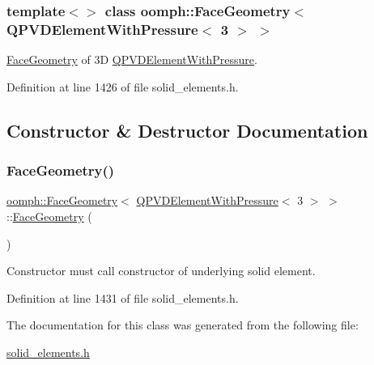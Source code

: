 \subsubsection*{template$<$$>$\newline
class oomph\+::\+Face\+Geometry$<$ Q\+P\+V\+D\+Element\+With\+Pressure$<$ 3 $>$ $>$}

\hyperlink{classoomph_1_1FaceGeometry}{Face\+Geometry} of 3D \hyperlink{classoomph_1_1QPVDElementWithPressure}{Q\+P\+V\+D\+Element\+With\+Pressure}. 

Definition at line 1426 of file solid\+\_\+elements.\+h.



\subsection{Constructor \& Destructor Documentation}
\mbox{\label{classoomph_1_1FaceGeometry_3_01QPVDElementWithPressure_3_013_01_4_01_4_a907dc793bd7a1a7ede1267b0fce05780}} 
\subsubsection{\texorpdfstring{Face\+Geometry()}{FaceGeometry()}}
{\footnotesize\ttfamily \hyperlink{classoomph_1_1FaceGeometry}{oomph\+::\+Face\+Geometry}$<$ \hyperlink{classoomph_1_1QPVDElementWithPressure}{Q\+P\+V\+D\+Element\+With\+Pressure}$<$ 3 $>$ $>$\+::\hyperlink{classoomph_1_1FaceGeometry}{Face\+Geometry} (\begin{DoxyParamCaption}{ }\end{DoxyParamCaption})\hspace{0.3cm}{\ttfamily [inline]}}



Constructor must call constructor of underlying solid element. 



Definition at line 1431 of file solid\+\_\+elements.\+h.



The documentation for this class was generated from the following file\+:\begin{DoxyCompactItemize}
\item 
\hyperlink{solid__elements_8h}{solid\+\_\+elements.\+h}\end{DoxyCompactItemize}
